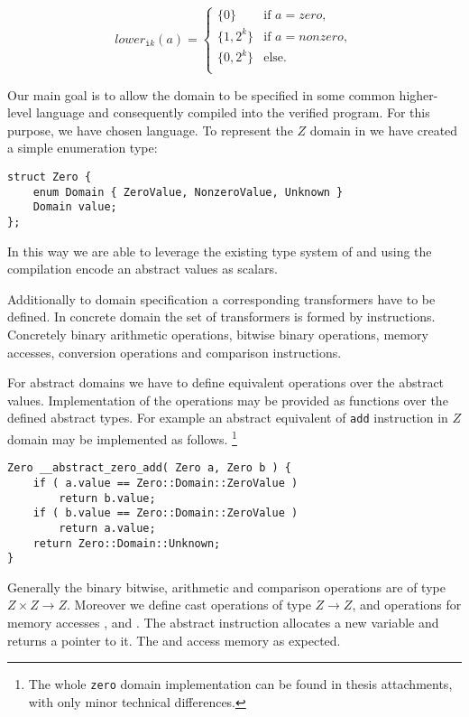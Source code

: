 \[
  lower_{\texttt{i}k}(a) =
  \begin{cases}
    \{0\}      & \text{if } a = \textit{zero},\\
    \{1, 2^k\} & \text{if } a = \textit{nonzero}, \\
    \{0, 2^k\} & \text{else}. \\
  \end{cases}
\]

Our main goal is to allow the domain to be specified in some common higher-level
language and consequently compiled into the verified program. For this purpose,
we have chosen \Cpp{} language. To represent the $Z$ domain in
\Cpp{} we have created a simple enumeration type:
\begin{verbatim}
struct Zero {
    enum Domain { ZeroValue, NonzeroValue, Unknown }
    Domain value;
};
\end{verbatim}
In this way we are able to leverage the existing type system of \LLVM and
using the compilation encode an abstract values as \LLVM scalars.

Additionally to domain specification a corresponding transformers have to be
defined. In concrete domain the set of transformers is formed by \LLVM
instructions. Concretely binary arithmetic operations, bitwise binary
operations, memory accesses, conversion operations and comparison instructions.

For abstract domains we have to define equivalent operations over the abstract
values. Implementation of the operations may be provided as \Cpp{} functions over
the defined abstract types. For example an abstract equivalent of \texttt{add}
instruction in $Z$ domain may be implemented as follows. \footnote{The whole
\texttt{zero} domain implementation can be found in thesis attachments, with
only minor technical differences.}
\begin{verbatim}
Zero __abstract_zero_add( Zero a, Zero b ) {
    if ( a.value == Zero::Domain::ZeroValue )
        return b.value;
    if ( b.value == Zero::Domain::ZeroValue )
        return a.value;
    return Zero::Domain::Unknown;
}
\end{verbatim}

Generally the binary bitwise, arithmetic and comparison operations are of
type $Z \times Z \to Z$. Moreover we define cast operations of type $Z \to Z$,
and operations for memory accesses ,  and . The abstract  instruction allocates a new 
variable and returns a pointer to it. The  and  access memory as expected.

